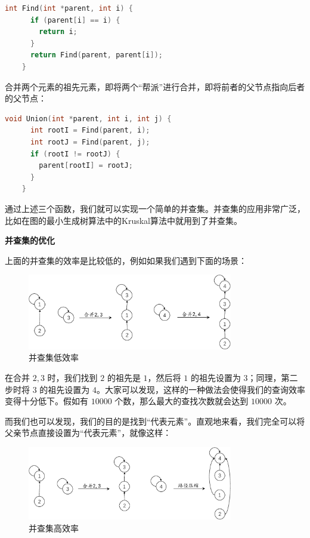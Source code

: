 \documentclass[lang=cn,newtx,10pt,scheme=chinese]{elegantbook}
\begin{document}
  \begin{lstlisting}[language=C++, caption={查找元素的祖先元素}]
    int Find(int *parent, int i) {
      if (parent[i] == i) {
        return i;
      }
      return Find(parent, parent[i]);
    }

  \end{lstlisting}

  合并两个元素的祖先元素，即将两个“帮派”进行合并，即将前者的父节点指向后者的父节点：

  \begin{lstlisting}[language=C++, caption={合并两个元素的祖先元素}]
    void Union(int *parent, int i, int j) {
      int rootI = Find(parent, i);
      int rootJ = Find(parent, j);
      if (rootI != rootJ) {
        parent[rootI] = rootJ;
      }
    }
  \end{lstlisting}

  通过上述三个函数，我们就可以实现一个简单的并查集。并查集的应用非常广泛，比如在图的最小生成树算法中的Kruskal算法中就用到了并查集。

  \textbf{并查集的优化}

  上面的并查集的效率是比较低的，例如如果我们遇到下面的场景：

  \begin{figure}
    \centering
    \includegraphics[width=0.8\textwidth]{./figure/pdf/cropped/unionFindLow.pdf}
    \caption{并查集低效率}
    \label{fig:unionFind6}
  \end{figure}

  在合并 $2, 3$ 时，我们找到 $2$ 的祖先是 $1$，然后将 $1$ 的祖先设置为 $3$；同理，第二步时将 $3$ 的祖先设置为 $4$。大家可以发现，这样的一种做法会使得我们的查询效率变得十分低下。假如有 $10000$ 个数，那么最大的查找次数就会达到 $10000$ 次。

  而我们也可以发现，我们的目的是找到“代表元素”。直观地来看，我们完全可以将父亲节点直接设置为“代表元素”，就像这样：

  \begin{figure}[h!]
    \centering
    \includegraphics[width=0.8\textwidth]{./figure/pdf/cropped/pathCompress.pdf}
    \caption{并查集高效率}
    \label{fig:unionFind7}
  \end{figure}
\end{document}
